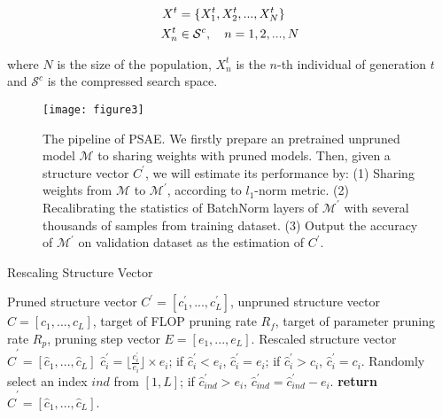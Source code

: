 \documentclass[final]{cvpr}
\begin{document}
\begin{align}
    X^t &= \{ X_1^t, X_2^t,..., X_N^t\} \notag\\
    X_n^t &\in \mathcal{S}^c, \quad n=1,2,...,N \label{eq7}
\end{align}

\noindent where $N$ is the size of the population, $X_n^t$ is the $n$-th individual of generation $t$ and 
$\mathcal{S}^c$ is the compressed search space.


\begin{figure*}[t]
    \centering
    \texttt{[image: figure3]} 
    \caption{
        The pipeline of PSAE. We firstly prepare an pretrained unpruned model $\mathcal{M}$ to sharing weights with pruned models. 
        Then, given a structure vector $C^{'}$, we will estimate its performance by: (1) Sharing weights from $\mathcal{M}$
        to $\mathcal{M^{'}}$, according to $l_1$-norm metric. (2) Recalibrating the statistics of BatchNorm layers of $\mathcal{M^{'}}$ with several thousands of samples
        from training dataset. (3) Output the accuracy of $\mathcal{M^{'}}$ on validation dataset as the estimation of $C^{'}$.
    }
    \label{fig4}
\end{figure*}


\begin{algorithm}[t]
	\renewcommand{\algorithmicrequire}{\textbf{Input:}}
	\renewcommand{\algorithmicensure}{\textbf{Output:}}
	\caption{Rescaling Structure Vector}
	\label{alg:1}
	\begin{algorithmic}[1]
        \REQUIRE Pruned structure vector $C^{'}=[c_{1}^{'},..., c_{L}^{'}]$, 
        unpruned structure vector $C=[c_{1},..., c_{L}]$,
        target of FLOP pruning rate $R_f$,
        target of parameter pruning rate $R_p$,
        pruning step vector $E=[e_1, ..., e_L]$.
		\ENSURE Rescaled structure vector $\hat{C}^{'}=[\hat{c}_{1},..., \hat{c}_{L}]$
            \STATE $\hat{c}_{i}^{'} = \lfloor \frac{c_{i}^{'}}{e_{i}} \rfloor \times e_{i}$;
            \STATE if $\hat{c}_{i}^{'} < e_{i}$, $ \hat{c}_{i}^{'}=e_{i}$;
            \STATE if $\hat{c}_{i}^{'} > c_{i}$, $ \hat{c}_{i}^{'}=c_{i}$.
        \ENDFOR
            \STATE Randomly select an index $ind$ from $[1,L]$;
            \STATE if $\hat{c}_{ind}^{'} > e_i$, $\hat{c}_{ind}^{'} = \hat{c}_{ind}^{'} - e_{i}$.
        \ENDWHILE
        \STATE \textbf{return} $\hat{C}^{'}=[\hat{c}_{1},..., \hat{c}_{L}]$.
	\end{algorithmic}  
\end{algorithm}
\end{document}
